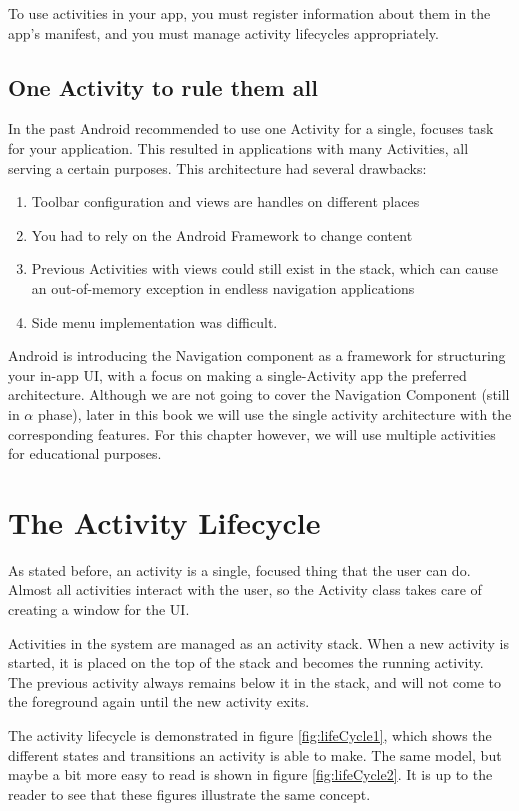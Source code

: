 To use activities in your app, you must register information about them in the app’s manifest, and you must manage activity lifecycles appropriately.

\subsection{One Activity to rule them all}
In the past Android recommended to use one Activity for a single, focuses task for your application.
This resulted in applications with many Activities, all serving a certain purposes.
This architecture had several drawbacks:

\begin{enumerate}
	\item Toolbar configuration and views are handles on different places
	\item You had to rely on the Android Framework to change content
	\item Previous Activities with views could still exist in the stack, which can cause an out-of-memory exception in endless navigation applications
	\item Side menu implementation was difficult.
\end{enumerate}

Android is introducing the Navigation component as a framework for structuring your in-app UI, with a focus on making a single-Activity app the preferred architecture.
Although we are not going to cover the Navigation Component (still in $\alpha$ phase), later in this book we will use the single activity architecture with the corresponding features.
For this chapter however, we will use multiple activities for educational purposes.

\section{The Activity Lifecycle}
As stated before, an activity is a single, focused thing that the user can do.
Almost all activities interact with the user, so the Activity class takes care of creating a window for the UI.

Activities in the system are managed as an activity stack.
When a new activity is started, it is placed on the top of the stack and becomes the running activity.
The previous activity always remains below it in the stack, and will not come to the foreground again until the new activity exits.

The activity lifecycle is demonstrated in figure \ref{fig:lifeCycle1}, which shows the different states and transitions an activity is able to make.
The same model, but maybe a bit more easy to read is shown in figure \ref{fig:lifeCycle2}.
It is up to the reader to see that these figures illustrate the same concept.

